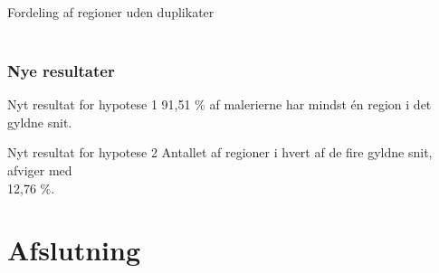 \documentclass[xcolor=table]{beamer}
\begin{document}
\begin{frame}
\begin{columns}[t]
            Fordeling af regioner uden duplikater
    \end{columns}

\end{frame}

\subsection*{}
\begin{frame}

    \frametitle{Nye resultater}

    \begin{block}{Nyt resultat for hypotese 1\hspace{12em}}
        91,51 \% af malerierne har mindst én region i det gyldne snit.\\
    \end{block}

    \begin{block}{Nyt resultat for hypotese 2\hspace{14em}}
        Antallet af regioner i hvert af de fire gyldne snit, afviger med \\12,76 \%.
    \end{block}

\end{frame}

\section{Afslutning}
\end{document}
